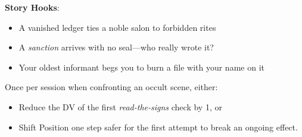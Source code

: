 \textbf{Story Hooks}:
\begin{itemize}
  \item A vanished ledger ties a noble salon to forbidden rites
  \item A \emph{sanction} arrives with no seal—who really wrote it?
  \item Your oldest informant begs you to burn a file with your name on it
\end{itemize}

\begin{tcolorbox}[colback=red!3!white,colframe=red!60!black,title=Witch Hunter Quick Boons,fonttitle=\bfseries]
Once per session when confronting an occult scene, either:
\begin{itemize}
  \item Reduce the DV of the first \emph{read-the-signs} check by 1, or
  \item Shift Position one step safer for the first attempt to break an ongoing effect.
\end{itemize}
\end{tcolorbox}
